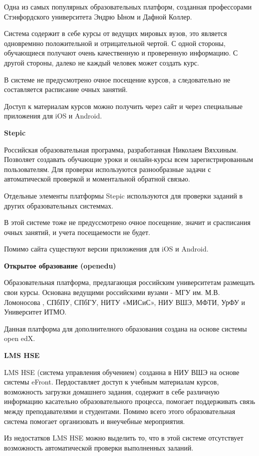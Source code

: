 \documentclass[a4paper,14pt]{article}
\begin{document}
Одна из самых популярных образовательных платформ, созданная профессорами Стэнфордского университета Эндрю Ыном и Дафной Коллер. 

Система содержит в себе курсы от ведущих мировых вузов, это является одновремнно положительной и отрицательной чертой. С одной стороны, обучающиеся получают  очень качественную и проверенную информацию. С другой стороны, далеко не каждый человек может создать курс.

В системе не предусмотрено очное посещение курсов, а следовательно не составляется расписание очных занятий.

Доступ к материалам курсов можно получить через сайт и через специальные приложения для iOS и Android.

\textbf{Stepic}

Российская образовательная программа, разработанная Николаем Вяххиным. Позволяет создавать обучающие уроки и онлайн-курсы всем зарегистрированным пользователям. Для проверки используются разнообразные задачи с автоматической проверкой и моментальной обратной связью.

Отдельные элементы платформы Stepic используются для проверки заданий в других образовательных системмах.

В этой системе тоже не предуссмотрено очное посещение, значит и срасписания очных занятий, и учета посещаемости не будет.

Помимо сайта существуют версии приложения для iOS и Android.

\textbf{Открытое образование (openedu)}

Образовательная платформа, предлагающая российским университетам размещать свои курсы. Основана ведущими российскими вузами - МГУ им. М.В. Ломоносова , СПбПУ, СПбГУ, НИТУ «МИСиС», НИУ ВШЭ, МФТИ, УрФУ и Университет ИТМО.

Данная платформа для дополнителного образования создана на основе системы open edX.

\textbf{LMS HSE}

LMS HSE (система управления обучением) созданна в НИУ ВШЭ на основе системы eFront. Пердоставляет доступ к учебным материалам курсов, возможность загрузки домашнего задания, содержит в себе различную информацию касательно образовательного процесса, помогает поддерживать связь между преподавателями и студентами.
Помимо всего этого образовательная система помогает организовать и внеучебные мероприятия. 

Из недостатков LMS HSE можно выделить то, что в этой системе отсутствует возможность автоматической проверки выполненных заланий.
\end{document}
